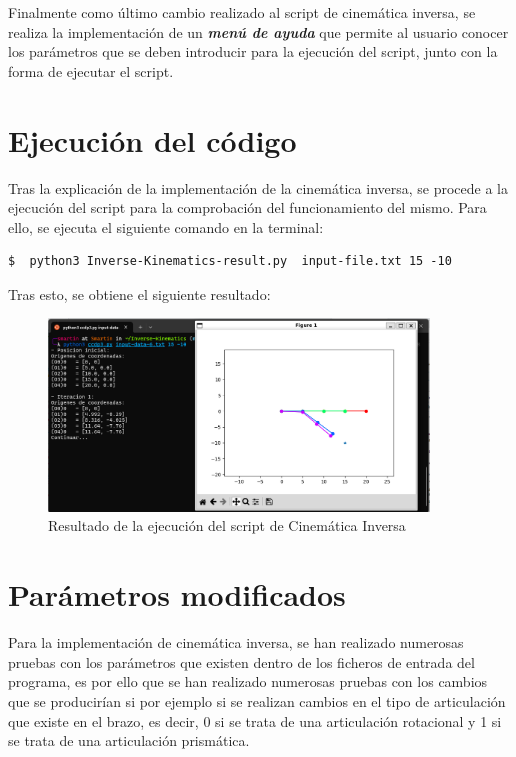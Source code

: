 \documentclass[11pt]{report}
\begin{document}


Finalmente como último cambio realizado al script de cinemática inversa, se realiza la implementación de un \emph{\textbf{menú de ayuda}} que permite al usuario conocer los parámetros que se deben introducir para la ejecución del script, junto con la forma de ejecutar el script.

\section{Ejecución del código}

Tras la explicación de la implementación de la cinemática inversa, se procede a la ejecución del script para la comprobación del funcionamiento del mismo. Para ello, se ejecuta el siguiente comando en la terminal:

\begin{lstlisting}[style=bash, caption={Ejecución del script de Cinemática Inversa}, label=bash]
  $  python3 Inverse-Kinematics-result.py  input-file.txt 15 -10
\end{lstlisting}

Tras esto, se obtiene el siguiente resultado:

\begin{figure}[H]
    \centering
    \includegraphics[width=0.9\textwidth]{src/img/Inverse-Kinematics-result.png}
    \caption{Resultado de la ejecución del script de Cinemática Inversa}
    \label{fig:inverse-kinematics-result}
\end{figure}

\section{Parámetros modificados}

Para la implementación de cinemática inversa, se han realizado numerosas pruebas con los parámetros que existen dentro de los ficheros de entrada del programa, es por ello que se han realizado numerosas pruebas con los cambios que se producirían si por ejemplo si se realizan cambios en el tipo de articulación que existe en el brazo, es decir, 0 si se trata de una articulación rotacional y 1 si se trata de una articulación prismática. 
\end{document}
